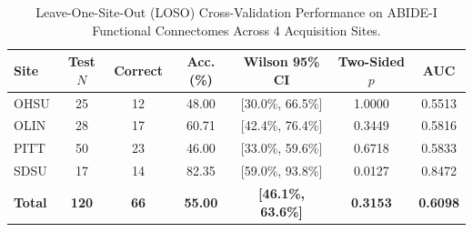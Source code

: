 \begin{table}[h]
\centering
\caption{Leave-One-Site-Out (LOSO) Cross-Validation Performance on ABIDE-I Functional Connectomes Across 4 Acquisition Sites.}
\label{tab:fmri_loso}
\footnotesize
\setlength{\tabcolsep}{3.5pt}
\begin{tabular}{lcccccc}
\toprule
\textbf{Site} & \textbf{Test $N$} & \textbf{Correct} & \textbf{Acc. (\%)} & \textbf{Wilson 95\% CI} & \textbf{Two-Sided $p$} & \textbf{AUC} \\
\midrule
OHSU & 25 & 12 & 48.00 & [30.0\%, 66.5\%] & 1.0000 & 0.5513 \\
OLIN & 28 & 17 & 60.71 & [42.4\%, 76.4\%] & 0.3449 & 0.5816 \\
PITT & 50 & 23 & 46.00 & [33.0\%, 59.6\%] & 0.6718 & 0.5833 \\
SDSU & 17 & 14 & 82.35 & [59.0\%, 93.8\%] & 0.0127 & 0.8472 \\
\midrule
\textbf{Total} & \textbf{120} & \textbf{66} & \textbf{55.00} & \textbf{[46.1\%, 63.6\%]} & \textbf{0.3153} & \textbf{0.6098} \\
\bottomrule
\end{tabular}
\end{table}
